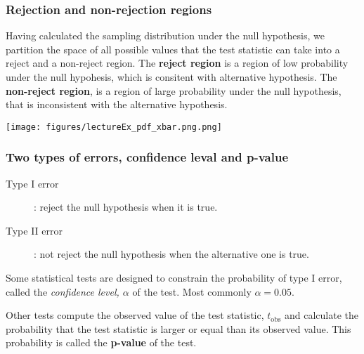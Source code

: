 \documentclass{beamer}
\begin{document}
\begin{frame}
\frametitle{Rejection and non-rejection regions}

    Having calculated the sampling distribution under the null hypothesis, we
    partition the space of all possible values that the test statistic can take
    into a reject and a non-reject region. The \textbf{reject region} is a
    region of low probability under the null hypohesis, which is consitent with
    alternative hypothesis. The \textbf{non-reject region}, is a region of
    large probability under the null hypothesis, that is inconsistent with the
    alternative hypothesis.

    \begin{center}
        \texttt{[image: figures/lectureEx\_pdf\_xbar.png.png]}
    \end{center}
\end{frame}

\begin{frame}
\frametitle{Two types of errors, confidence leval and p-value}

    \begin{description}

        \item[Type I error]: reject the null hypothesis when it is true.

        \item[Type II error]: not reject the null hypothesis when the
            alternative one is true.

    \end{description}

    Some statistical tests are designed to constrain the probability of type I
    error, called the \emph{confidence level, $\alpha$} of the test. Most
    commonly $\alpha=0.05$.

    Other tests compute the observed value of the test statistic,
    $t_\text{obs}$ and calculate the probability that the test statistic is
    larger or equal than its observed value.  This probability is called the
    \textbf{p-value} of the test.

\end{frame}
\end{document}

